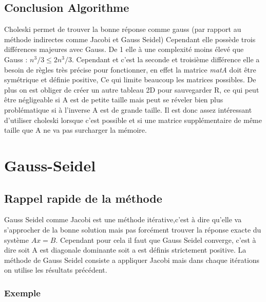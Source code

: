 \documentclass[12pt]{article}
\begin{document}
\subsection{Conclusion Algorithme}
\begin{multicols}{2}


Choleski permet de trouver la bonne réponse comme gauss (par rapport au méthode indirectes comme Jacobi et Gauss Seidel) Cependant elle possède trois différences majeures avec Gauss. De 1 elle à une complexité moins élevé que Gauss : $n^3/3 \leq 2n^3/3$. Cependant et c’est la seconde et troisième différence elle a besoin de règles très précise pour fonctionner, en effet la matrice \textit{matA} doit être symétrique et définie positive, Ce qui limite beaucoup les matrices possibles. De plus on est obliger de créer un autre tableau 2D pour sauvegarder R, ce qui peut être négligeable si A est de petite taille mais peut se réveler bien plus problématique si à l'inverse A est de grande taille. Il est donc assez intéressant d’utiliser choleski lorsque c’est possible et si une matrice supplémentaire de même taille que A ne va pas surcharger la mémoire. 

\end{multicols}

\section{Gauss-Seidel}


\subsection{Rappel rapide de la méthode}



\begin{multicols}{2}

  Gauss Seidel comme Jacobi est une méthode itérative,c’est à dire qu’elle va s’approcher de la bonne solution mais pas forcément trouver la réponse exacte du système $Ax=B$. Cependant pour cela il faut que Gauss Seidel converge, c'est à dire soit A est diagonale dominante soit a est définis strictement positive. La méthode de Gauss Seidel consiste a appliquer Jacobi mais dans chaque itérations on utilise les résultats précédent.
  
  \subsubsection{Exemple}

  

\end {multicols}
\end{document}

